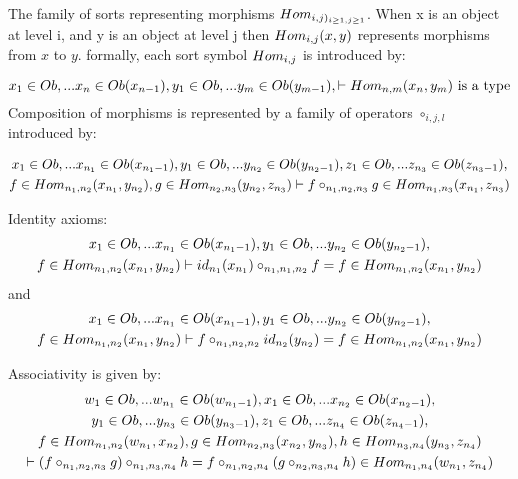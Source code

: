 \documentclass[10pt,a4paper]{scrartcl}
\begin{document}
\noindent The family of sorts representing morphisms
$Hom_{i,j)_{i\geq 1,j\geq1}}$. 
When x is an object at level i, and y is an object at level j then $Hom_{i,j}(x,y)$ represents morphisms from $x$ to $y$. 
formally, each sort symbol $Hom_{i,j}$ is introduced by:

\begin{equation}
\label{sortintroterm}
x_1 \in Ob,... x_{n} \in Ob(x_{n-1}), y_1 \in Ob,... y_{m} \in Ob(y_{m-1}),
\vdash Hom_{n,m}(x_n,y_m)\mbox{ is a type}
 \\
\end{equation}
\noindent Composition of morphisms is represented by a family of operators $\circ_{i,j,l}$ introduced by:

\begin{multline}
\label{compositionintro}
x_1 \in Ob,... x_{{n_1}} \in Ob(x_{{n_1}-1}), y_1 \in Ob,... y_{{n_2}} \in Ob(y_{{n_2}-1}),z_1 \in Ob,... z_{{n_3}} \in Ob(z_{{n_3}-1}), \\
f \in Hom_{{n_1},{n_2}}(x_{n_1},y_{n_2}), g \in Hom_{{n_2},{n_3}}(y_{n_2},z_{n_3})
\vdash f \circ_{{n_1},{n_2},{n_3}} g \in Hom_{{n_1},{n_3}}(x_{n_1},z_{n_3})
\end{multline}

\noindent Identity axioms:
\begin{multline}
\label{leftidentity}
x_1 \in Ob,... x_{{n_1}} \in Ob(x_{{n_1}-1}), y_1 \in Ob,... y_{{n_2}} \in Ob(y_{{n_2}-1}), \\
f \in Hom_{{n_1},{n_2}}(x_{n_1},y_{n_2})
\vdash id_{n_1}(x_{n_1}) \circ_{{n_1},{n_1},{n_2}} f 
                = f 
								 \in Hom_{{n_1},{n_2}}(x_{n_1},y_{n_2})
\end{multline}
\noindent and
\begin{multline}
\label{rightidentity}
x_1 \in Ob,... x_{{n_1}} \in Ob(x_{{n_1}-1}), y_1 \in Ob,... y_{{n_2}} \in Ob(y_{{n_2}-1}), \\
f \in Hom_{{n_1},{n_2}}(x_{n_1},y_{n_2})
\vdash f \circ_{{n_1},{n_2},{n_2}} id_{n_2}(y_{n_2}) 
                = f 
								 \in Hom_{{n_1},{n_2}}(x_{n_1},y_{n_2})
\end{multline}

\noindent Associativity is given by:
\begin{multline}
\label{associativity}
w_1 \in Ob,... w_{{n_1}} \in Ob(w_{{n_1}-1}),x_1 \in Ob,... x_{{n_2}} \in Ob(x_{{n_2}-1}), \\
y_1 \in Ob,... y_{{n_3}} \in Ob(y_{{n_3}-1}),z_1 \in Ob,... z_{{n_4}} \in Ob(z_{{n_4}-1}), \\
f \in Hom_{{n_1},{n_2}}(w_{n_1},x_{n_2}), 
g \in Hom_{{n_2},{n_3}}(x_{n_2},y_{n_3}), 
h \in Hom_{{n_3},{n_4}}(y_{n_3},z_{n_4}) \\
\vdash (f \circ_{{n_1},{n_2},{n_3}} g) \circ_{n_1,n_3,n_4} h 
                 = f \circ_{{n_1},{n_2},{n_4}} ( g \circ_{n_2,n_3,n_4} h )
								 \in Hom_{{n_1},{n_4}}(w_{n_1},z_{n_4})
\end{multline}
\end{document}
